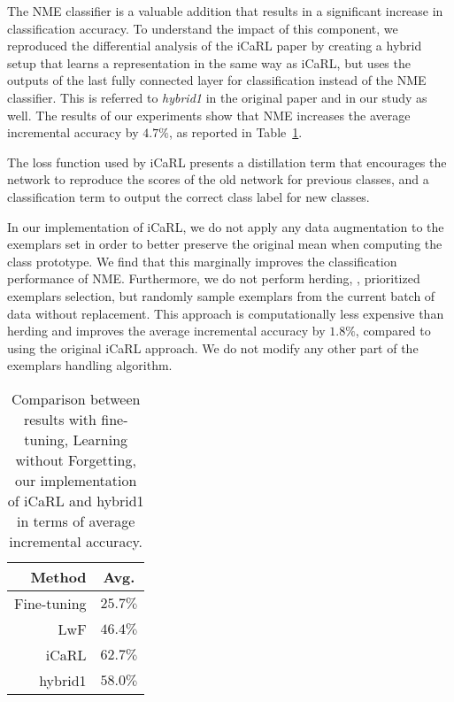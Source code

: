 \documentclass[10pt,twocolumn,letterpaper]{article}
\begin{document}
The NME classifier is a valuable addition that results in a significant increase in classification accuracy. To understand the impact of this component, we reproduced the differential analysis of the iCaRL paper by creating a hybrid setup that learns a representation in the same way as iCaRL, but uses the outputs of the last fully connected layer for classification instead of the NME classifier. This is referred to \emph{hybrid1} in the original paper and in our study as well. The results of our experiments show that NME increases the average incremental accuracy by $4.7\%$, as reported in Table~\ref{tab:experiments}.

The loss function used by iCaRL presents a distillation term that encourages the network to reproduce the scores of the old network for previous classes, and a classification term to output the correct class label for new classes.

In our implementation of iCaRL, we do not apply any data augmentation to the exemplars set in order to better preserve the original mean when computing the class prototype. We find that this marginally improves the classification performance of NME. Furthermore, we do not perform herding, \ie, prioritized exemplars selection, but randomly sample exemplars from the current batch of data without replacement. This approach is computationally less expensive than herding and improves the average incremental accuracy by $1.8\%$, compared to using the original iCaRL approach. We do not modify any other part of the exemplars handling algorithm.

\begin{table}
    \begin{center}
        \begin{tabular}{|r|c|}
        \hline
        Method & Avg. \\
        \hline\hline
        Fine-tuning & $25.7\%$ \\
        LwF & $46.4\%$ \\
        iCaRL &  $62.7\%$ \\
        hybrid1 &  $58.0\%$ \\
        \hline
        \end{tabular}
    \end{center}
\caption{Comparison between results with fine-tuning, Learning without Forgetting, our implementation of iCaRL and hybrid1 in terms of average incremental accuracy.
}
\label{tab:experiments}
\end{table}
\end{document}
